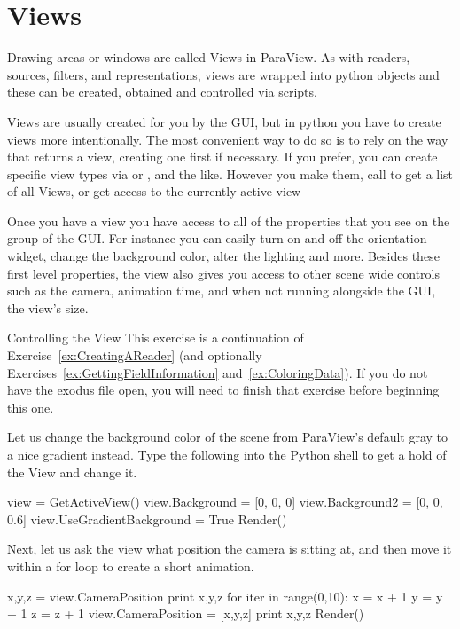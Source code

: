 \section{Views}
\label{sec:Views}

Drawing areas or windows are called Views in ParaView.
As with readers, sources, filters, and representations, views are wrapped
into python objects and these can be created, obtained and controlled via scripts.

Views are usually created for you by the GUI, but in python you have to create views more intentionally.
The most convenient way to do so is to rely on the way that  returns a view, creating one first if necessary.
If you prefer, you can create specific view types via  or ,  and the like.
However you make them, call  to get a list of all Views,  or  get access to the currently active view

Once you have a view you have access to all of the properties that you see on
the  group of the GUI. For instance you can easily turn on and off the orientation widget, change the background color, alter the lighting and more.
Besides these first level properties, the view also gives you access to other scene wide controls such as the camera, animation time, and when not running alongside the GUI, the view's size.

\begin{exercise}{Controlling the View}
  \label{ex:ControlView}%
  This exercise is a continuation of Exercise~\ref{ex:CreatingAReader} (and
  optionally Exercises~\ref{ex:GettingFieldInformation}
  and~\ref{ex:ColoringData}).
  If you do not have the exodus file open, you will need to finish that
  exercise before beginning this one.

  Let us change the background color of the scene from ParaView's default gray 
  to a nice gradient instead. Type the following into the Python shell
  to get a hold of the View and change it.

  \begin{python}
view = GetActiveView()
view.Background = [0, 0, 0]
view.Background2 = [0, 0, 0.6]
view.UseGradientBackground = True
Render()
  \end{python}

  Next, let us ask the view what position the camera is sitting at, and
  then move it within a for loop to create a short animation.
  \begin{python}
x,y,z = view.CameraPosition
print x,y,z
for iter in range(0,10):
  x = x + 1
  y = y + 1
  z = z + 1
  view.CameraPosition = [x,y,z]
  print x,y,z
  Render()
  \end{python}

\end{exercise}


